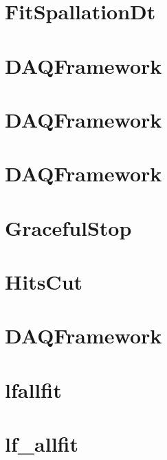 \let\mypdfximage\pdfximage\def\pdfximage{\immediate\mypdfximage}\documentclass[twoside]{book}
\newcommand{\+}{\discretionary{\mbox{\scriptsize$\hookleftarrow$}}{}{}}
\begin{document}
\chapter{Fit\+Spallation\+Dt}
\label{md_UserTools_FitSpallationDt_README}

\chapter{DAQFramework}
\label{md_UserTools_FlagAFTs_README}

\chapter{DAQFramework}
\label{md_UserTools_GetSubTrg_SetTimingGate_README}

\chapter{DAQFramework}
\label{md_UserTools_GetSubTriggers_README}

\chapter{Graceful\+Stop}
\label{md_UserTools_GracefulStop_README}

\chapter{Hits\+Cut}
\label{md_UserTools_IDHitsCut_README}

\chapter{DAQFramework}
\label{md_UserTools_InactiveTools_README}

\chapter{lfallfit}
\label{md_UserTools_lfallfit_README}

\chapter{lf\+\_\+allfit}
\label{md_UserTools_lfallfit_simple_README}

\end{document}
